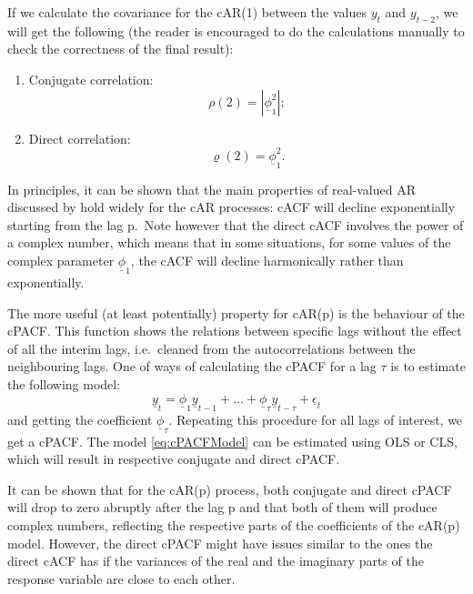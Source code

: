 \documentclass[
]{book}
\begin{document}
If we calculate the covariance for the cAR(1) between the values \(y_{t}\) and \(y_{t-2}\), we will get the following (the reader is encouraged to do the calculations manually to check the correctness of the final result):

\begin{enumerate}
\def\labelenumi{\arabic{enumi}.}
\item
  Conjugate correlation:
  \begin{equation}
   \rho(2) = | \underline{\phi}_1^2 |;
   \label{eq:ComplexAR1ConjCor}
  \end{equation}
\item
  Direct correlation:
  \begin{equation}
   \varrho(2) =  \underline{\phi}_1^2.
   \label{eq:ComplexAR1DirCor}
  \end{equation}
\end{enumerate}

In principles, it can be shown that the main properties of real-valued AR discussed by \citet{Box1976} hold widely for the cAR processes: cACF will decline exponentially starting from the lag p.~Note however that the direct cACF involves the power of a complex number, which means that in some situations, for some values of the complex parameter \(\underline{\phi}_1\), the cACF will decline harmonically rather than exponentially.

The more useful (at least potentially) property for cAR(p) is the behaviour of the cPACF. This function shows the relations between specific lags without the effect of all the interim lags, i.e.~cleaned from the autocorrelations between the neighbouring lags. One of ways of calculating the cPACF for a lag \(\tau\) is to estimate the following model:
\begin{equation}
    \underline{y}_t = \underline{\phi}_1 \underline{y}_{t-1} + \dots + \underline{\phi}_\tau \underline{y}_{t-\tau} + \underline{\epsilon}_t
    \label{eq:cPACFModel}
\end{equation}
and getting the coefficient \(\underline{\phi}_\tau\). Repeating this procedure for all lags of interest, we get a cPACF. The model \eqref{eq:cPACFModel} can be estimated using OLS or CLS, which will result in respective conjugate and direct cPACF.

It can be shown that for the cAR(p) process, both conjugate and direct cPACF will drop to zero abruptly after the lag p and that both of them will produce complex numbers, reflecting the respective parts of the coefficients of the cAR(p) model. However, the direct cPACF might have issues similar to the ones the direct cACF has if the variances of the real and the imaginary parts of the response variable are close to each other.
\end{document}
